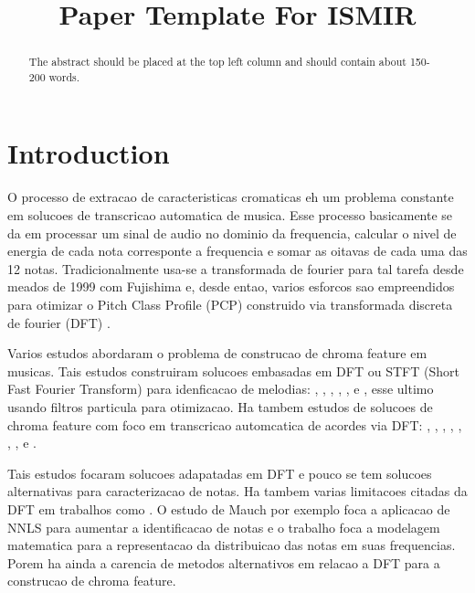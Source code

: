 \documentclass{article}
\title{Paper Template For ISMIR \conferenceyear}
\begin{document}
%
\maketitle
%
\begin{abstract}
The abstract should be placed at the top left column and should contain about 150-200 words.
\end{abstract}
%
\section{Introduction}\label{sec:introduction}


	O processo de extracao de caracteristicas cromaticas eh um problema constante em solucoes de transcricao automatica de musica. Esse processo basicamente se da em processar um sinal de audio no dominio da frequencia, calcular o nivel de energia de cada nota corresponte a frequencia e somar as oitavas de cada uma das 12 notas. Tradicionalmente usa-se a transformada de fourier para tal tarefa desde meados de 1999 com Fujishima \cite{fujishima1999realtime} e, desde entao, varios esforcos sao empreendidos para otimizar o Pitch Class Profile (PCP) construido via transformada discreta de fourier (DFT) .

	Varios estudos abordaram o problema de construcao de chroma feature em musicas. Tais estudos construiram solucoes embasadas em DFT ou STFT (Short Fast Fourier Transform) para idenficacao de melodias: \cite{muto2002transcription}, \cite{al2008time}, \cite{barbancho2009transcription}, \cite{gomez2004automatic}, \cite{tangmelody}, \cite{eggink2004extracting} e \cite{jo2010melody}, esse ultimo usando filtros particula para otimizacao. Ha tambem estudos de solucoes de chroma feature com foco em transcricao automcatica de acordes via DFT:
	\cite{harte2009automatic}, \cite{khadkevich2011time}, \cite{harte2010towards}, \cite{peeters2006chroma}, \cite{cho2010exploring} \cite{lee2006automatic}, \cite{de2012improving}, \cite{boulanger2013audio}, \cite{chen2012chord} e \cite{hrybyk2010combined}.

	Tais estudos focaram solucoes adapatadas em DFT e pouco se tem solucoes alternativas para caracterizacao de notas. Ha tambem varias limitacoes citadas da DFT em trabalhos como \cite{harte2010towards}. O estudo de Mauch\cite{mauch2010approximate} por exemplo foca a aplicacao de NNLS para aumentar a identificacao de notas e o trabalho \cite{wakefield1999mathematical} foca a modelagem matematica	para a representacao da distribuicao das notas em suas frequencias. Porem ha ainda a carencia de metodos alternativos em relacao a DFT para a construcao de chroma feature.
\end{document}
